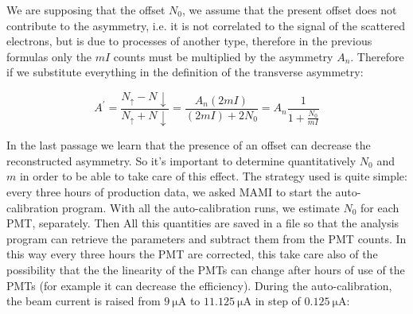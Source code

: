 We are supposing that the offset $N_{0}$, we assume that the present offset does not contribute to the asymmetry, i.e. it is not correlated to the signal of the scattered electrons, but is due to processes of another type, therefore in the previous formulas only the $mI$ counts must be multiplied by the asymmetry $A_{n}$. Therefore if we substitute everything in the definition of the transverse asymmetry:

\begin{equation} \label{eq:Systematic}
A^{'} = \dfrac{N_{\uparrow} - N{\downarrow}}{N_{\uparrow} + N{\downarrow}} = \dfrac{A_{n} (2mI)}{ (2mI) + 2N_{0} } = A_{n} \dfrac{1}{1 + \frac{N_{0}}{mI}}
\end{equation} 

In the last passage we learn that the presence of an offset can decrease the reconstructed asymmetry. So it's important to determine quantitatively $N_{0}$ and $m$ in order to be able to take care of this effect. The strategy used is quite simple: every three hours of production data, we asked MAMI to start the auto-calibration program. With all the auto-calibration runs, we estimate $N_{0}$ for each PMT, separately. Then All this quantities are saved in a file so that the analysis program can retrieve the parameters and subtract them from the PMT counts.
In this way every three hours the PMT are corrected, this take care also of the possibility that the the linearity of the PMTs can change after hours of use of the PMTs (for example it can decrease the efficiency).
During the auto-calibration, the beam current is raised from $\SI{9}{\micro \ampere}$ to $\SI{11.125}{\micro \ampere}$ in step of $\SI{0.125}{\micro \ampere}$:

\begin{figure}[!ht]
\centering
{}
\end{figure}

